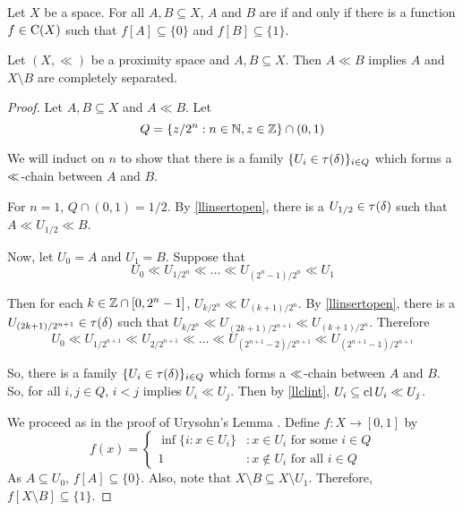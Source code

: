 \begin{definition}
	Let \( X \) be a space.  For all \( A,B \subseteq X \), \( A \) and \( B \) are  if and only if there is a function \( f \in \operatorname{C}(X) \) such that \( f[A] \subseteq \{0\} \) and \( f[B] \subseteq \{1\} \).
\end{definition}

\begin{theorem}
	\label{llcompsep}
	Let \( (X,\ll) \) be a proximity space and \( A,B \subseteq X \).  Then \( A \ll B \) implies \( A \) and \( X \setminus B \) are completely separated.
\end{theorem}
\begin{proof}
	Let \( A,B \subseteq X \) and \( A \ll B \).  Let
	\[ Q = \{ z/2^n: n \in \mathbb{N}, z \in \mathbb{Z} \} \cap (0,1) \]
	
	We will induct on \( n \) to show that there is a family \( \{ U_i \in \tau(\mathord{\delta}) \}_{i \in Q} \) which forms a \( \mathord{\ll} \)-chain between \( A \) and \( B \).
	
	For \( n = 1 \), \( Q \cap (0,1) = 1/2 \).  By \ref{llinsertopen}, there is a \( U_{1/2} \in \tau(\mathord{\delta}) \) such that \( A \ll U_{1/2} \ll B \).
	
	Now, let \( U_0 = A \) and \( U_1 = B \).  Suppose that
	\[ U_0 \ll U_{1/2^n} \ll \dots \ll U_{(2^n-1)/2^n} \ll U_1 \]
	
	Then for each \( k \in \mathbb{Z} \cap [0,2^n-1] \), \( U_{k/2^n} \ll U_{(k+1)/2^n} \).  By \ref{llinsertopen}, there is a \( U_{(2k+1)/2^{n+1}} \in \tau(\mathord{\delta}) \) such that \( U_{k/2^n} \ll U_{(2k+1)/2^{n+1}} \ll U_{(k+1)/2^n} \).  Therefore
	\[ U_0 \ll U_{1/2^{n+1}} \ll U_{2/2^{n+1}} \ll \dots \ll U_{(2^{n+1}-2)/2^{n+1}} \ll U_{(2^{n+1}-1)/2^{n+1}} \]

	So, there is a family \( \{ U_i \in \tau(\mathord{\delta}) \}_{i \in Q} \) which forms a \( \mathord{\ll} \)-chain between \( A \) and \( B \).  So, for all \( i,j \in Q \), \( i < j \) implies \( U_i \ll U_j \).  Then by \ref{llclint}, \( U_i \subseteq \operatorname{cl}{U_i} \ll U_j \).
	
	We proceed as in the proof of Urysohn's Lemma \cite{urysohn}.  Define \( f:X \rightarrow [0,1] \) by
	\begin{displaymath}
	f(x) = \left\{
		\begin{array}{ll}
			\inf\{i: x \in U_i\}	& : x \in U_i \text{ for some } i \in Q\\
			1											& : x \not\in U_i \text{ for all } i \in Q
		\end{array}
	\right.
	\end{displaymath}
	As \( A \subseteq U_0 \), \( f[A] \subseteq \{0\} \).  Also, note that \( X \setminus B \subseteq X \setminus U_1 \).  Therefore, \( f[X \setminus B] \subseteq \{1\} \).
	

\end{proof}
